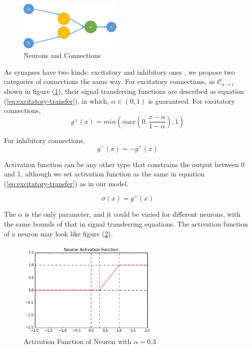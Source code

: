 \documentclass[conference]{IEEEtran}
\begin{document}
\begin{figure}
\centering
\includegraphics[height=24mm]{paper_res/conn.png}
\caption{Neurons and Connections}
\label{fig:neurons}
\end{figure}

As synapses have two kinds: excitatory and inhibitory ones
\cite{uchizono1965characteristics,wilson1972excitatory},
we propose two categories of connections the same way.
For excitatory connections, as $\mathcal{C}_{a\rightarrow c}$
shown in figure (\ref{fig:neurons}), their signal
transferring functions are described as equation
(\ref{eq:excitatory-transfer}), in which, $\alpha\in(0,1)$
is guaranteed.
For excitatory connections,
\begin{equation}
    g^{+}(x)=min\left(max\left(0,\frac{x-\alpha}{1-\alpha}\right),1\right)
    \label{eq:excitatory-transfer}
\end{equation}

For inhibitory connections,
\begin{equation}
    g^{-}(x)=-g^{+}(x)
    \label{eq:inhibitory-transfer}
\end{equation}

Activation function can be any other type that constrains the output between
0 and 1, although we set activation function as the same in equation
(\ref{eq:excitatory-transfer}) as in our model.

\begin{equation}
    \sigma(x)=g^{+}(x)
    \label{eq:activation}
\end{equation}

The $\alpha$ is the only parameter, and it could be varied for
different neurons, with the same bounds of that in signal
transferring equations. The activation function of a neuron may
look like figure (\ref{fig:activation}).

\begin{figure}
    \centering
    \includegraphics[height=48mm]{paper_res/activation.png}
    \caption{Activation Function of Neuron with $\alpha=0.3$}
    \label{fig:activation}
\end{figure}
\end{document}
